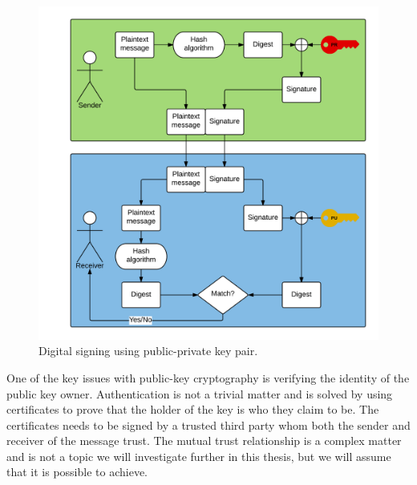 \begin{figure}[h!]
  \captionsetup{justification=centering,margin=1.5cm}
  \caption{Digital signing using public-private key pair.}
  \label{fig:signing_basic}
  \centering
    \includegraphics[width=1\textwidth]{images/signing_basic.png}
\end{figure}

One of the key issues with public-key cryptography is verifying the identity of the public key owner. Authentication is not a trivial matter and is solved by using certificates to prove that the holder of the key is who they claim to be. The certificates needs to be signed by a trusted third party whom both the sender and receiver of the message trust. The mutual trust relationship is a complex matter and is not a topic we will investigate further in this thesis, but we will assume that it is possible to achieve.

